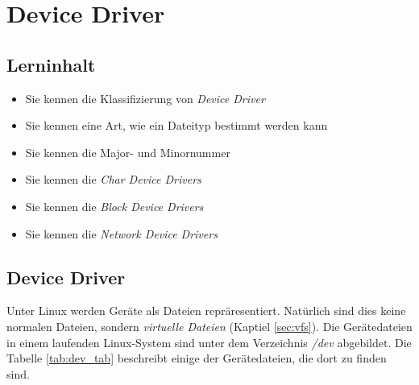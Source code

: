 \section{Device Driver}

\subsection{Lerninhalt}

\begin{itemize}
   \item Sie kennen die Klassifizierung von \emph{Device Driver}
   \item Sie kennen eine Art, wie ein Dateityp bestimmt werden kann
   \item Sie kennen die Major- und Minornummer
   \item Sie kennen die \emph{Char Device Drivers}
   \item Sie kennen die \emph{Block Device Drivers}
   \item Sie kennen die \emph{Network Device Drivers}
\end{itemize}

\subsection{Device Driver}

Unter Linux werden Geräte als Dateien repräresentiert. Natürlich sind dies keine normalen Dateien, sondern \emph{virtuelle Dateien} (Kaptiel \ref{sec:vfs}).
Die Gerätedateien in einem laufenden Linux-System sind unter dem Verzeichnis \emph{/dev} abgebildet. Die Tabelle \ref{tab:dev_tab} beschreibt einige der Gerätedateien,
die dort zu finden sind.

